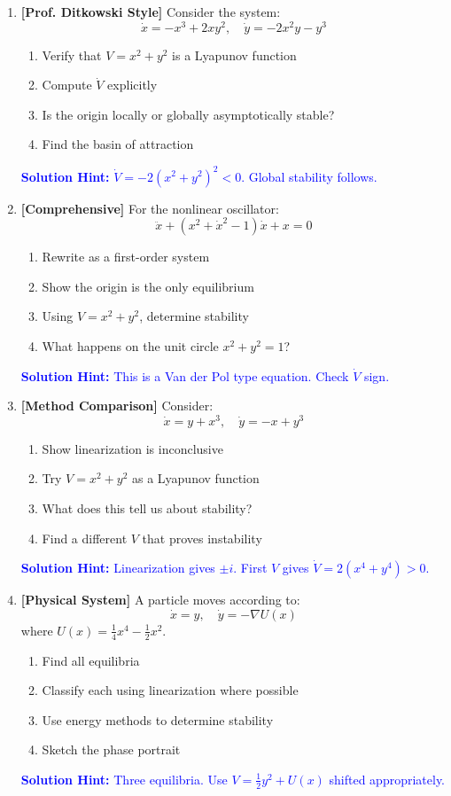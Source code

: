 \documentclass[12pt]{article}
\newcommand{\solution}[1]{\textcolor{blue}{\textbf{Solution Hint:} #1}}
\begin{document}
\begin{enumerate}[resume]
\item \textbf{[Prof. Ditkowski Style]} Consider the system:
$$\dot{x} = -x^3 + 2xy^2, \quad \dot{y} = -2x^2y - y^3$$
\begin{enumerate}[label=(\alph*)]
    \item Verify that $V = x^2 + y^2$ is a Lyapunov function
    \item Compute $\dot{V}$ explicitly
    \item Is the origin locally or globally asymptotically stable?
    \item Find the basin of attraction
\end{enumerate}
\solution{$\dot{V} = -2(x^2+y^2)^2 < 0$. Global stability follows.}

\item \textbf{[Comprehensive]} For the nonlinear oscillator:
$$\ddot{x} + (x^2 + \dot{x}^2 - 1)\dot{x} + x = 0$$
\begin{enumerate}[label=(\alph*)]
    \item Rewrite as a first-order system
    \item Show the origin is the only equilibrium
    \item Using $V = x^2 + y^2$, determine stability
    \item What happens on the unit circle $x^2 + y^2 = 1$?
\end{enumerate}
\solution{This is a Van der Pol type equation. Check $\dot{V}$ sign.}

\item \textbf{[Method Comparison]} Consider:
$$\dot{x} = y + x^3, \quad \dot{y} = -x + y^3$$
\begin{enumerate}[label=(\alph*)]
    \item Show linearization is inconclusive
    \item Try $V = x^2 + y^2$ as a Lyapunov function
    \item What does this tell us about stability?
    \item Find a different $V$ that proves instability
\end{enumerate}
\solution{Linearization gives $\pm i$. First $V$ gives $\dot{V} = 2(x^4+y^4) > 0$.}

\item \textbf{[Physical System]} A particle moves according to:
$$\dot{x} = y, \quad \dot{y} = -\nabla U(x)$$
where $U(x) = \frac{1}{4}x^4 - \frac{1}{2}x^2$.
\begin{enumerate}[label=(\alph*)]
    \item Find all equilibria
    \item Classify each using linearization where possible
    \item Use energy methods to determine stability
    \item Sketch the phase portrait
\end{enumerate}
\solution{Three equilibria. Use $V = \frac{1}{2}y^2 + U(x)$ shifted appropriately.}


\end{enumerate}
\end{document}
